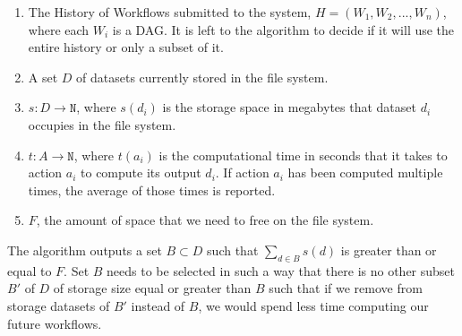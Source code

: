 \begin{enumerate}
\item The History of Workflows submitted to the system, $H = (W_1, W_2, ..., W_n)$, where each $W_i$ is a DAG. It is left to the algorithm to decide if it will use the entire history or only a subset of it.

\item A set $D$ of datasets currently stored in the file system. 

\item $s: D \to \mathtt{N} $, where $s(d_i)$ is the storage space in megabytes that dataset $d_i$ occupies in the file system.

\item $t: A \to \mathtt{N}$, where $t(a_i)$ is the computational time in seconds that it takes to action $a_i$ to compute its output $d_i$.  If action $a_i$ has been computed multiple times, the average of those times is reported.

\item $F$, the amount of space that we need to free on the file system.

\end{enumerate}

The algorithm outputs a set $B \subset D$ such that $\sum_{d \in B}{s(d)}$ is greater than or equal to $F$.  Set $B$ needs to be selected in such a way that there is no other subset $B'$ of $D$ of storage size equal or greater than $B$ such that if we remove from storage datasets of $B'$ instead of $B$, we would spend less time computing our future workflows. 